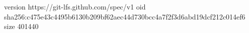 version https://git-lfs.github.com/spec/v1
oid sha256:c475e43c4495b6130b209bf62aec44d730bcc4a7f2f3d6abd19dcf212c014ef6
size 401440
